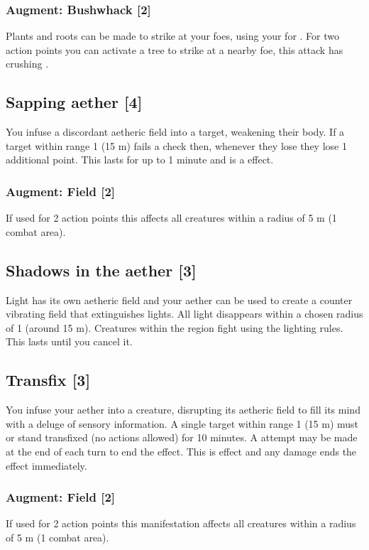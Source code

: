 \subsubsection{Augment: Bushwhack [2]}
Plants and roots can be made to strike at your foes, using your  for . For two action points you can activate a tree to strike at a nearby foe, this attack has crushing .


\subsection{Sapping aether [4]}
You infuse a discordant aetheric field into a target, weakening their body. If a target within range 1 (15 m) fails a  check then, whenever they lose  they lose 1 additional point. This lasts for up to 1 minute and  is a  effect.
\subsubsection{Augment: Field [2]}
If used for 2 action points this affects all creatures within a radius of 5 m (1 combat area).


\subsection{Shadows in the aether [3]}
Light has its own aetheric field and your aether can be used to create a counter vibrating field that extinguishes lights. All light disappears within a chosen radius of 1 (around 15 m). Creatures within the region fight using the  lighting rules. This lasts until you cancel it.


\subsection{Transfix [3]}
You infuse your aether into a creature, disrupting its aetheric field to fill its mind with a deluge of sensory information. A single target within range 1 (15 m) must  or stand transfixed (no actions allowed) for 10 minutes. A  attempt may be made at the end of each turn to end the effect. This is  effect and any damage ends the effect immediately. 
\subsubsection{Augment: Field [2]}
If used for 2 action points this manifestation affects all creatures within a radius of 5 m (1 combat area).

